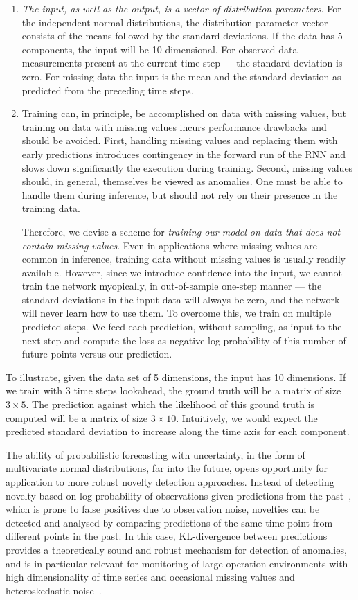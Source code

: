 \documentclass[runningheads]{llncs}
\begin{document}
\begin{enumerate}
\item \textit{The input, as well as the output, is a vector of
distribution parameters}. For the independent normal
distributions, the distribution parameter vector consists of the
means followed by the standard deviations. If the data has 5
components, the input will be 10-dimensional. For observed data
--- measurements present at the current time step --- the
standard deviation is zero. For missing data the input is the
mean and the standard deviation as predicted from the preceding
time steps.

\item  Training can, in principle, be accomplished on data with
missing values, but training on data with missing values
incurs performance drawbacks and should be avoided. First,
handling missing values and replacing them with early
predictions introduces contingency in the forward run of the RNN
and slows down significantly the execution during training.
Second, missing values should, in general, themselves be viewed
as anomalies. One must be able to handle them during inference, 
but should not rely on their presence in the training data.

Therefore, we devise a scheme for \textit{training our model on data
that does not contain missing values}. Even in applications where
missing values are common in inference, training data without
missing values is usually readily available. However,
since we introduce confidence into the input, we cannot
train the network myopically, in out-of-sample one-step manner --- 
the standard deviations in the input data will always be zero,
and the network will never learn how to use them. To overcome
this, we train on multiple predicted steps. We feed each
prediction, without sampling, as input to the next step and
compute the loss as negative log probability of this number of
future points versus our prediction.
\end{enumerate}

To illustrate, given the data set of 5 dimensions, the input has 10
dimensions. If we train with 3 time steps lookahead, the ground
truth will be a matrix of size $3\times 5$. The prediction against
which the likelihood of this ground truth is computed will be
a matrix of size $3 \times 10$. Intuitively, we would expect the
predicted standard deviation to increase along the time axis
for each component.

The ability of probabilistic forecasting with uncertainty, in
the form of multivariate normal distributions, far into the
future, opens opportunity for application to more robust novelty
detection approaches. Instead of detecting novelty based on log
probability of observations given predictions from the
past~\cite{CBK09}, which is prone to false positives due to
observation noise, novelties can be detected and analysed by
comparing predictions of the same time point from different
points in the past.  In this case,
KL-divergence between predictions provides a theoretically sound
and robust mechanism for detection of anomalies, and is in
particular relevant for monitoring of large operation
environments with high dimensionality of time series and
occasional missing values and heteroskedastic noise~\cite{ASH08,T19}.
\end{document}
